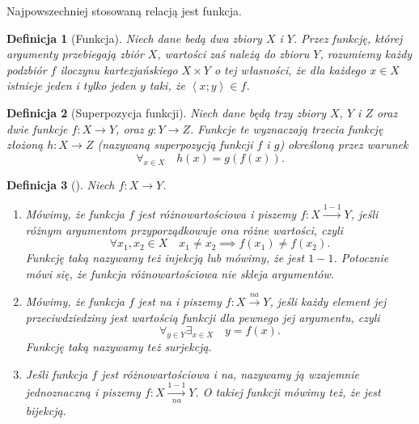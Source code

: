 \documentclass[12pt,a4paper]{report}
\newtheorem{definition}{Definicja}
\newcommand{\parauporzadkowana}[2]{\left\langle {#1}; {#2} \right\rangle}
\begin{document}
Najpowszechniej stosowaną relacją jest funkcja.

\begin{definition}[Funkcja\citep{kuratowski1966wstkep}]
Niech dane bedą dwa zbiory $X$ i $Y$. Przez funkcję, której argumenty przebiegają zbiór $X$, wartości zaś należą do zbioru $Y$, rozumiemy każdy podzbiór $f$ iloczynu kartezjańskiego $X \times Y$ o tej własności, że dla każdego $x \in X$ istnieje jeden i tylko jeden $y$ taki, że $\parauporzadkowana{x}{y} \in f$. 

\end{definition}
\begin{definition}[Superpozycja funkcji\citep{kuratowski1966wstkep}]
Niech dane będą trzy zbiory $X$, $Y$ i $Z$ oraz dwie funkcje $f:X\to Y$, oraz $g:Y\to Z$. Funkcje te wyznaczają trzecia funkcję złożoną $h:X\to Z$ (nazywaną superpozycją funkcji $f$ i $g$) określoną przez warunek
\begin{equation*}
\forall_{x \in X} \quad h(x)=g(f(x)).
\end{equation*}
\end{definition}

\begin{definition}[\citep{kraszewski2007wstkep}]
Niech $f:X \to Y$.
\begin{enumerate}
\item
Mówimy, że funkcja $f$ jest różnowartościowa i piszemy $f:X\xrightarrow{1-1} Y$, jeśli różnym argumentom przyporządkowuje ona różne wartości, czyli
\begin{equation*}
\forall{x_{1},x_{2}}\in X \quad x_{1}\ne x_{2} \implies f(x_{1})\ne f(x_{2}).
\end{equation*}
Funkcję taką nazywamy też injekcją lub mówimy, że jest $1-1$. Potocznie mówi się, że funkcja różnowartościowa nie skleja argumentów.
\item
Mówimy, że funkcja $f$ jest na i piszemy $f:X\xrightarrow{na}Y$, jeśli każdy element jej przeciwdziedziny jest wartością funkcji dla pewnego jej argumentu, czyli
\begin{equation*}
\forall_{y\in Y} \exists_{x\in X} \quad y=f(x).
\end{equation*}
Funkcję taką nazywamy też surjekcją.
\item
Jeśli funkcja $f$ jest różnowartościowa i na, nazywamy ją wzajemnie jednoznaczną i piszemy $f:X\xrightarrow[na]{1-1} Y$. O takiej funkcji mówimy też, że jest bijekcją.
\end{enumerate}
\end{definition}
\end{document}
